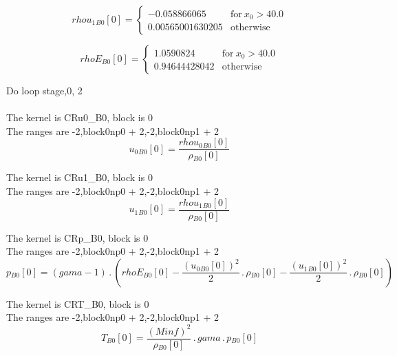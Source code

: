 \documentclass{article}
\begin{document}
\begin{dmath}{rhou_{1}{_{B0}}}[{0}] = \begin{cases} -0.058866065 & \text{for}\: x_{0} > 40.0 \\0.00565001630205 & \text{otherwise} \end{cases}\end{dmath}

\begin{dmath}{rhoE{_{B0}}}[{0}] = \begin{cases} 1.0590824 & \text{for}\: x_{0} > 40.0 \\0.94644428042 & \text{otherwise} \end{cases}\end{dmath}

\noindent Do loop stage,0, 2\\
\\\noindent The kernel is CRu0_B0, block is 0\\\noindent The ranges are -2,block0np0 + 2,-2,block0np1 + 2\\\begin{dmath}{u_{0}{_{B0}}}[{0}] = \frac{{rhou_{0}{_{B0}}}[{0}]}{{\rho{_{B0}}}[{0}]}\end{dmath}

\noindent The kernel is CRu1_B0, block is 0\\\noindent The ranges are -2,block0np0 + 2,-2,block0np1 + 2\\\begin{dmath}{u_{1}{_{B0}}}[{0}] = \frac{{rhou_{1}{_{B0}}}[{0}]}{{\rho{_{B0}}}[{0}]}\end{dmath}

\noindent The kernel is CRp_B0, block is 0\\\noindent The ranges are -2,block0np0 + 2,-2,block0np1 + 2\\\begin{dmath}{p{_{B0}}}[{0}] = \left(gama - 1\right) \,.\, \left({rhoE{_{B0}}}[{0}] - \frac{\left({u_{0}{_{B0}}}[{0}] \right)^{2}}{2} \,.\, {\rho{_{B0}}}[{0}] - \frac{\left({u_{1}{_{B0}}}[{0}] \right)^{2}}{2} \,.\, 
{\rho{_{B0}}}[{0}]\right)\end{dmath}

\noindent The kernel is CRT_B0, block is 0\\\noindent The ranges are -2,block0np0 + 2,-2,block0np1 + 2\\\begin{dmath}{T{_{B0}}}[{0}] = \frac{\left(Minf \right)^{2}}{{\rho{_{B0}}}[{0}]} \,.\, gama \,.\, {p{_{B0}}}[{0}]\end{dmath}
\end{document}
